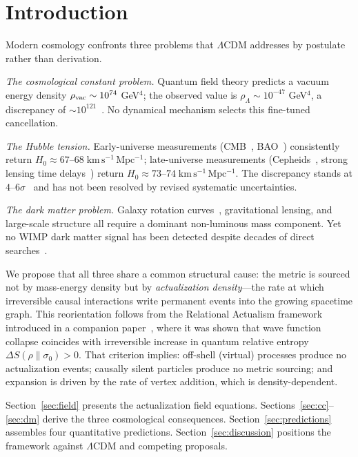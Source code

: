 \documentclass[11pt,twocolumn]{article}
\theoremstyle{plain}
\theoremstyle{remark}
\begin{document}
\section{Introduction}

Modern cosmology confronts three problems that $\Lambda$CDM addresses
by postulate rather than derivation.

\emph{The cosmological constant problem.}
Quantum field theory predicts a vacuum energy density $\rho_{\rm vac}
\sim 10^{74}$ GeV$^4$; the observed value is $\rho_\Lambda \sim
10^{-47}$ GeV$^4$, a discrepancy of $\sim\!10^{121}$~\cite{Weinberg1989}.
No dynamical mechanism selects this fine-tuned cancellation.

\emph{The Hubble tension.}
Early-universe measurements (CMB~\cite{Planck2020}, BAO~\cite{DESI2024})
consistently return $H_0 \approx 67$--$68\;\mathrm{km\,s^{-1}\,Mpc^{-1}}$;
late-universe measurements (Cepheids~\cite{Riess2022}, strong
lensing time delays~\cite{Wong2020}) return $H_0 \approx
73$--$74\;\mathrm{km\,s^{-1}\,Mpc^{-1}}$.
The discrepancy stands at $4$--$6\sigma$~\cite{Verde2019} and has
not been resolved by revised systematic uncertainties.

\emph{The dark matter problem.}
Galaxy rotation curves~\cite{Rubin1980}, gravitational lensing, and
large-scale structure all require a dominant non-luminous mass component.
Yet no WIMP dark matter signal has been detected despite decades of
direct searches~\cite{LZ2022,PandaX2023}.

We propose that all three share a common structural cause: the metric
is sourced not by mass-energy density but by \emph{actualization
density}---the rate at which irreversible causal interactions write
permanent events into the growing spacetime graph.
This reorientation follows from the Relational Actualism framework
introduced in a companion paper~\cite{Sandeman2026P2}, where it was
shown that wave function collapse coincides with irreversible increase
in quantum relative entropy $\Delta S(\rho\|\sigma_0) > 0$.
That criterion implies: off-shell (virtual) processes produce no
actualization events; causally silent particles produce no metric
sourcing; and expansion is driven by the rate of vertex addition,
which is density-dependent.

Section~\ref{sec:field} presents the actualization field equations.
Sections~\ref{sec:cc}--\ref{sec:dm} derive the three cosmological
consequences.
Section~\ref{sec:predictions} assembles four quantitative predictions.
Section~\ref{sec:discussion} positions the framework against $\Lambda$CDM
and competing proposals.
\end{document}
